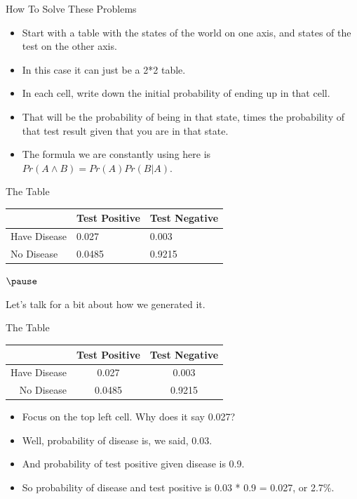 \documentclass[
  ignorenonframetext,
]{beamer}
\providecommand{\tightlist}{%
  \setlength{\itemsep}{0pt}\setlength{\parskip}{0pt}}
\renewcommand{\,}{\text{, }}
\begin{document}
\begin{frame}{How To Solve These Problems}
\protect\hypertarget{how-to-solve-these-problems}{}
\begin{itemize}
\tightlist
\item
  Start with a table with the states of the world on one axis, and
  states of the test on the other axis.
\item
  In this case it can just be a 2*2 table.
\item
  In each cell, write down the initial probability of ending up in that
  cell.
\item
  That will be the probability of being in that state, times the
  probability of that test result given that you are in that state.
\item
  The formula we are constantly using here is
  \(Pr(A \wedge B) = Pr(A) Pr(B | A)\).
\end{itemize}
\end{frame}

\begin{frame}{The Table}
\protect\hypertarget{the-table}{}
\begin{longtable}[]{@{}lll@{}}
\toprule
& Test Positive & Test Negative \\
\midrule
\endhead
Have Disease & 0.027 & 0.003 \\
No Disease & 0.0485 & 0.9215 \\
\bottomrule
\end{longtable}

\(\pause\)

Let's talk for a bit about how we generated it.
\end{frame}

\begin{frame}{The Table}
\protect\hypertarget{the-table-1}{}
\begin{longtable}[]{@{}rcc@{}}
\toprule
& Test Positive & Test Negative \\
\midrule
\endhead
Have Disease & 0.027 & 0.003 \\
No Disease & 0.0485 & 0.9215 \\
\bottomrule
\end{longtable}

\begin{itemize}
\tightlist
\item
  Focus on the top left cell. Why does it say 0.027?
\item
  Well, probability of disease is, we said, 0.03.
\item
  And probability of test positive given disease is 0.9.
\item
  So probability of disease and test positive is 0.03 * 0.9 = 0.027, or
  2.7\%.
\end{itemize}
\end{frame}
\end{document}
